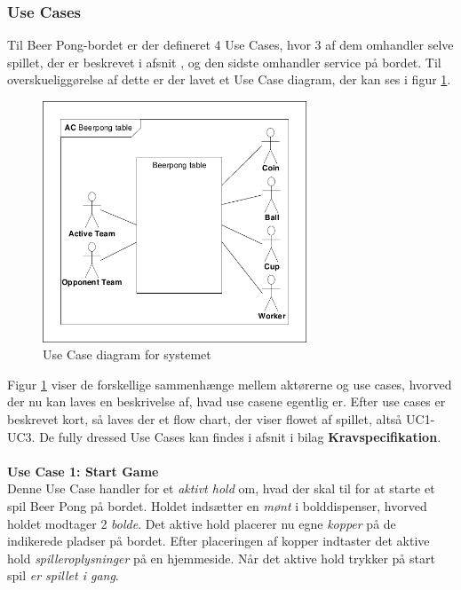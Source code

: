 \documentclass[Rapport/Rapport_main.tex]{subfiles}
\begin{document}
\subsubsection{Use Cases} \label{sec:rap_use_cases}
Til Beer Pong-bordet er der defineret 4 Use Cases, hvor 3 af dem omhandler selve spillet, der er beskrevet i afsnit , og den sidste omhandler service på bordet. Til overskueliggørelse af dette er der lavet et Use Case diagram, der kan ses i figur \ref{fig:rap_uc_diagram}.
\begin{figure}[H]
    \centering
    \includegraphics[width=0.7\textwidth,trim={0.24in 0.24in 0.24in 0.24in},clip, page=2]{Kravspecifikation/Funktionelle_krav/graphics_funktionel/Krav-spec-diagrammer.pdf}
    \caption{Use Case diagram for systemet}
    \label{fig:rap_uc_diagram}
\end{figure}
Figur \ref{fig:rap_uc_diagram} viser de forskellige sammenhænge mellem aktørerne og use cases, hvorved der nu kan laves en beskrivelse af, hvad use casene egentlig er. Efter use cases er beskrevet kort, så laves der et flow chart, der viser flowet af spillet, altså UC1-UC3. De fully dressed Use Cases kan findes i afsnit  i bilag \textbf{Kravspecifikation}.\\\\
\textbf{Use Case 1: Start Game}\\
Denne Use Case handler for et \textit{aktivt hold} om, hvad der skal til for at starte et spil Beer Pong på bordet. Holdet indsætter en \textit{mønt} i bolddispenser, hvorved holdet modtager 2 \textit{bolde}. Det aktive hold placerer nu egne \textit{kopper} på de indikerede pladser på bordet. Efter placeringen af kopper indtaster det aktive hold \textit{spilleroplysninger} på en hjemmeside. Når det aktive hold trykker på start spil \textit{er spillet i gang}.\\
\end{document}
